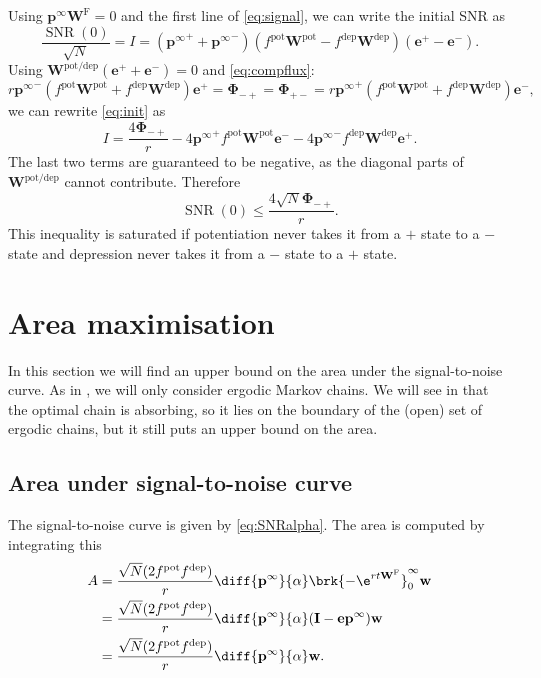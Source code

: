 \documentclass{article} %
\DeclareMathOperator{\SNR}{SNR}
\newcommand{\I}{\mathbf{I}}
\newcommand{\onev}{\mathbf{e}}
\newcommand{\pr}{\mathbf{p}}
\newcommand{\eq}{\pr^\infty}
\newcommand{\w}{\mathbf{w}}
\newcommand{\W}{\mathbf{W}}
\newcommand{\frg}{\W^{\mathrm{F}}}
\newcommand{\F}{\boldsymbol{\Phi}}
\newcommand{\pot}{^{\text{pot}}}
\newcommand{\dep}{^{\text{dep}}}
\newcommand{\potdep}{^{\text{pot/dep}}}
\begin{document}
Using $\eq\frg=0$ and the first line of \eqref{eq:signal}, we can write the initial SNR as
%
\begin{equation}\label{eq:init}
  \frac{\SNR(0)}{\sqrt{N}} = I = ({\eq}^++{\eq}^-)(f\pot \W\pot -f\dep \W\dep )(\onev^+-\onev^-).
\end{equation}
%
Using $\W\potdep (\onev^++\onev^-)=0$ and \eqref{eq:compflux}:
%
\begin{equation*}
  r{\eq}^-(f\pot \W\pot +f\dep \W\dep )\onev^+ = \F_{-+} = \F_{+-} = r{\eq}^+(f\pot \W\pot +f\dep \W\dep )\onev^-,
\end{equation*}
%
we can rewrite \eqref{eq:init} as
%
\begin{equation}\label{eq:initflux}
  I = \frac{4\F_{-+}}{r} - 4{\eq}^+f\pot \W\pot \onev^- - 4{\eq}^-f\dep \W\dep \onev^+.
\end{equation}
%
The last two terms are guaranteed to be negative, as the diagonal parts of $\W\potdep $ cannot contribute.
Therefore
%
\begin{equation}\label{eq:initfluxineq}
  \SNR(0) \leq \frac{4\sqrt{N}\F_{-+}}{r}.
\end{equation}
%
This inequality is saturated if potentiation never takes it from a $+$ state to a $-$ state and depression never takes it from a $-$ state to a $+$ state.


\section{Area maximisation}\label{sec:areamax}

In this section we will find an upper bound on the area under the signal-to-noise curve.
As in , we will only consider ergodic Markov chains.
We will see in  that the optimal chain is absorbing, so it lies on the boundary of the (open) set of ergodic chains, but it still puts an upper bound on the area.

\subsection{Area under signal-to-noise curve}\label{sec:area}

The signal-to-noise curve is given by \eqref{eq:SNRalpha}.
The area is computed by integrating this
%
\begin{equation}\label{eq:area}
\begin{aligned}
  A &= \frac{\sqrt{N}(2f\pot f\dep )}{r} \diff{\eq}{\alpha} \brk{-\e^{rt\frg}}_0^\infty \w \\
    &= \frac{\sqrt{N}(2f\pot f\dep )}{r} \diff{\eq}{\alpha} (\I-\onev\eq) \w \\
    &= \frac{\sqrt{N}(2f\pot f\dep )}{r} \diff{\eq}{\alpha} \w.
\end{aligned}
\end{equation}
%
\end{document}
